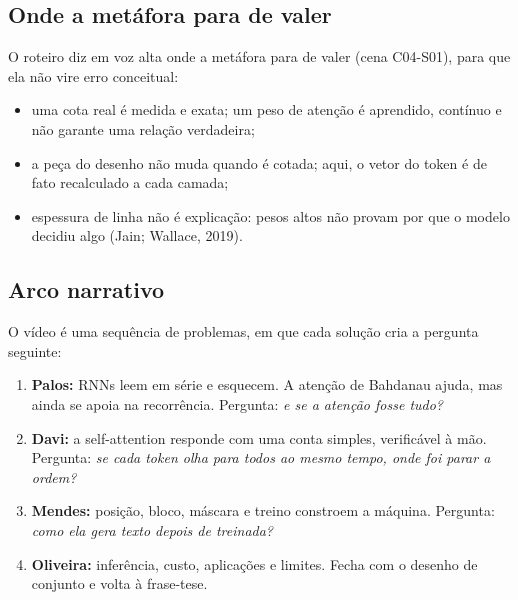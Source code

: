 \documentclass[11pt,a4paper]{article}
\begin{document}
\subsection{Onde a metáfora para de valer}
O roteiro diz em voz alta onde a metáfora para de valer (cena C04-S01), para que ela não vire erro conceitual:

\begin{itemize}
\item uma cota real é medida e exata; um peso de atenção é aprendido, contínuo e não garante uma relação verdadeira;
\item a peça do desenho não muda quando é cotada; aqui, o vetor do token é de fato recalculado a cada camada;
\item espessura de linha não é explicação: pesos altos não provam por que o modelo decidiu algo (Jain; Wallace, 2019).
\end{itemize}
\subsection{Arco narrativo}
O vídeo é uma sequência de problemas, em que cada solução cria a pergunta seguinte:

\begin{enumerate}
\item \textbf{Palos:} RNNs leem em série e esquecem. A atenção de Bahdanau ajuda, mas ainda se apoia na recorrência. Pergunta: \emph{e se a atenção fosse tudo?}
\item \textbf{Davi:} a self-attention responde com uma conta simples, verificável à mão. Pergunta: \emph{se cada token olha para todos ao mesmo tempo, onde foi parar a ordem?}
\item \textbf{Mendes:} posição, bloco, máscara e treino constroem a máquina. Pergunta: \emph{como ela gera texto depois de treinada?}
\item \textbf{Oliveira:} inferência, custo, aplicações e limites. Fecha com o desenho de conjunto e volta à frase-tese.
\end{enumerate}
\clearpage
\end{document}
